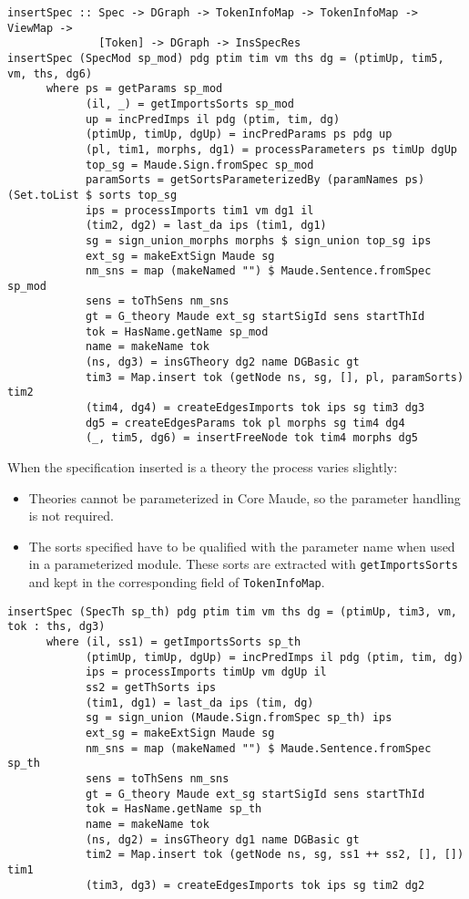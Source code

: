 {\codesize
\begin{verbatim}
insertSpec :: Spec -> DGraph -> TokenInfoMap -> TokenInfoMap -> ViewMap -> 
              [Token] -> DGraph -> InsSpecRes
insertSpec (SpecMod sp_mod) pdg ptim tim vm ths dg = (ptimUp, tim5, vm, ths, dg6)
      where ps = getParams sp_mod
            (il, _) = getImportsSorts sp_mod
            up = incPredImps il pdg (ptim, tim, dg)
            (ptimUp, timUp, dgUp) = incPredParams ps pdg up
            (pl, tim1, morphs, dg1) = processParameters ps timUp dgUp
            top_sg = Maude.Sign.fromSpec sp_mod
            paramSorts = getSortsParameterizedBy (paramNames ps) (Set.toList $ sorts top_sg
            ips = processImports tim1 vm dg1 il
            (tim2, dg2) = last_da ips (tim1, dg1)
            sg = sign_union_morphs morphs $ sign_union top_sg ips
            ext_sg = makeExtSign Maude sg
            nm_sns = map (makeNamed "") $ Maude.Sentence.fromSpec sp_mod
            sens = toThSens nm_sns
            gt = G_theory Maude ext_sg startSigId sens startThId
            tok = HasName.getName sp_mod
            name = makeName tok
            (ns, dg3) = insGTheory dg2 name DGBasic gt
            tim3 = Map.insert tok (getNode ns, sg, [], pl, paramSorts) tim2
            (tim4, dg4) = createEdgesImports tok ips sg tim3 dg3
            dg5 = createEdgesParams tok pl morphs sg tim4 dg4
            (_, tim5, dg6) = insertFreeNode tok tim4 morphs dg5
\end{verbatim}
}

When the specification inserted is a theory the process varies slightly:

\begin{itemize}
\item Theories cannot be parameterized in Core Maude, so the parameter
handling is not required.
\item The sorts specified have to be qualified with the parameter
name when used in a parameterized module. These sorts are extracted
with \verb"getImportsSorts" and kept in the corresponding field of
\verb"TokenInfoMap".
\end{itemize}

{\codesize
\begin{verbatim}
insertSpec (SpecTh sp_th) pdg ptim tim vm ths dg = (ptimUp, tim3, vm, tok : ths, dg3)
      where (il, ss1) = getImportsSorts sp_th
            (ptimUp, timUp, dgUp) = incPredImps il pdg (ptim, tim, dg)
            ips = processImports timUp vm dgUp il
            ss2 = getThSorts ips
            (tim1, dg1) = last_da ips (tim, dg)
            sg = sign_union (Maude.Sign.fromSpec sp_th) ips
            ext_sg = makeExtSign Maude sg
            nm_sns = map (makeNamed "") $ Maude.Sentence.fromSpec sp_th
            sens = toThSens nm_sns
            gt = G_theory Maude ext_sg startSigId sens startThId
            tok = HasName.getName sp_th
            name = makeName tok
            (ns, dg2) = insGTheory dg1 name DGBasic gt
            tim2 = Map.insert tok (getNode ns, sg, ss1 ++ ss2, [], []) tim1
            (tim3, dg3) = createEdgesImports tok ips sg tim2 dg2
\end{verbatim}
}

